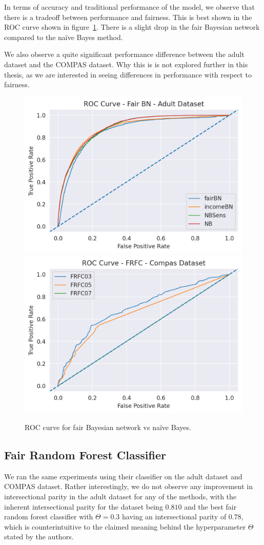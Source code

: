 In terms of accuracy and traditional performance of the model, we observe that there is a tradeoff between performance and fairness. This is best shown in the ROC curve shown in figure~\ref{fig:exp1fairBNROC}. There is a slight drop in the fair Bayesian network compared to the naïve Bayes method.

We also observe a quite significant performance difference between the adult dataset and the COMPAS dataset. Why this is is not explored further in this thesis, as we are interested in seeing differences in performance with respect to fairness.  
\begin{figure}
    \centering
    \includegraphics[width=0.49\linewidth]{figures/adult_fairbn_roc.png}
    \includegraphics[width=0.49\linewidth]{figures/compas_frfc_roc.png}
    \caption{ROC curve for fair Bayesian network vs naïve Bayes.}
    \label{fig:exp1fairBNROC}
\end{figure}

\subsection{Fair Random Forest Classifier}

We ran the same experiments using their classifier on the adult dataset and COMPAS dataset. Rather interestingly, we do not observe any improvement in intersectional parity in the adult dataset for any of the methods, with the inherent intersectional parity for the dataset being $0.810$ and the best fair random forest classifier with $\Theta = 0.3$ having an intersectional parity of $0.78$, which is counterintuitive to the claimed meaning behind the hyperparameter $\Theta$ stated by the authors.

